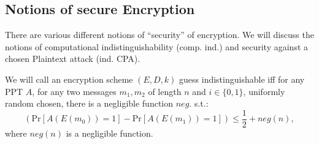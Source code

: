 \subsection{Notions of secure Encryption}
There are various different notions of ``security'' of encryption. We will discuss the notions of %
computational indistinguishability (comp. ind.) and security against a chosen Plaintext attack (ind. CPA). 
\begin{definition}
 We will call an encryption scheme $(E,D,k)$ guess indistinguishable iff for any PPT $A$, for any two messages $m_1, m_2$ of length $n$ and $i\in \{0,1\}$, uniformly random chosen, there is a negligible function $neg.$ s.t.:
 \[(\mathrm{Pr}\left[A(E(m_0))=1\right]-\mathrm{Pr}\left[A(E(m_1))=1\right])\leq \frac{1}{2}+neg(n), \] where $neg(n)$ is a negligible function.
\end{definition}
